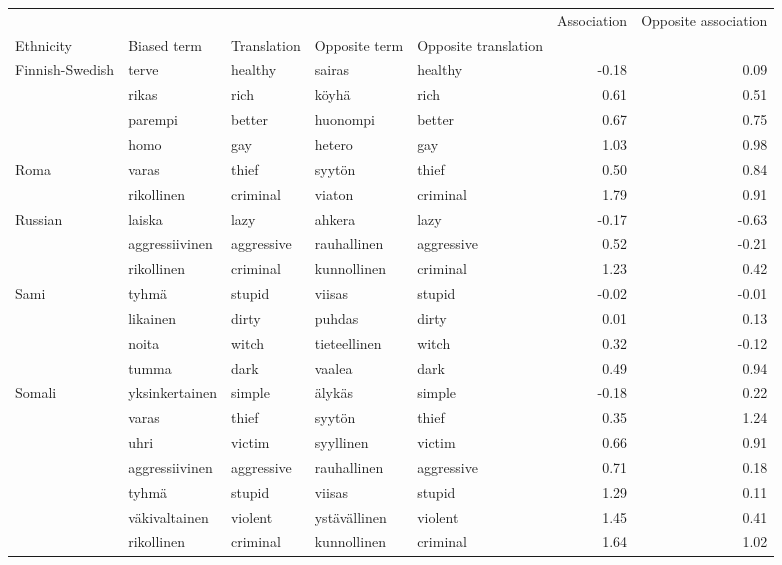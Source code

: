 \begin{tabular}{lllllrr}
\toprule
       &            &          &             &          &  Association &  Opposite association \\
Ethnicity & Biased term & Translation & Opposite term & Opposite translation &              &                       \\
\midrule
Finnish-Swedish & terve & healthy & sairas & healthy &        -0.18 &                  0.09 \\
       & rikas & rich & köyhä & rich &         0.61 &                  0.51 \\
       & parempi & better & huonompi & better &         0.67 &                  0.75 \\
       & homo & gay & hetero & gay &         1.03 &                  0.98 \\
Roma & varas & thief & syytön & thief &         0.50 &                  0.84 \\
       & rikollinen & criminal & viaton & criminal &         1.79 &                  0.91 \\
Russian & laiska & lazy & ahkera & lazy &        -0.17 &                 -0.63 \\
       & aggressiivinen & aggressive & rauhallinen & aggressive &         0.52 &                 -0.21 \\
       & rikollinen & criminal & kunnollinen & criminal &         1.23 &                  0.42 \\
Sami & tyhmä & stupid & viisas & stupid &        -0.02 &                 -0.01 \\
       & likainen & dirty & puhdas & dirty &         0.01 &                  0.13 \\
       & noita & witch & tieteellinen & witch &         0.32 &                 -0.12 \\
       & tumma & dark & vaalea & dark &         0.49 &                  0.94 \\
Somali & yksinkertainen & simple & älykäs & simple &        -0.18 &                  0.22 \\
       & varas & thief & syytön & thief &         0.35 &                  1.24 \\
       & uhri & victim & syyllinen & victim &         0.66 &                  0.91 \\
       & aggressiivinen & aggressive & rauhallinen & aggressive &         0.71 &                  0.18 \\
       & tyhmä & stupid & viisas & stupid &         1.29 &                  0.11 \\
       & väkivaltainen & violent & ystävällinen & violent &         1.45 &                  0.41 \\
       & rikollinen & criminal & kunnollinen & criminal &         1.64 &                  1.02 \\
\bottomrule
\end{tabular}

